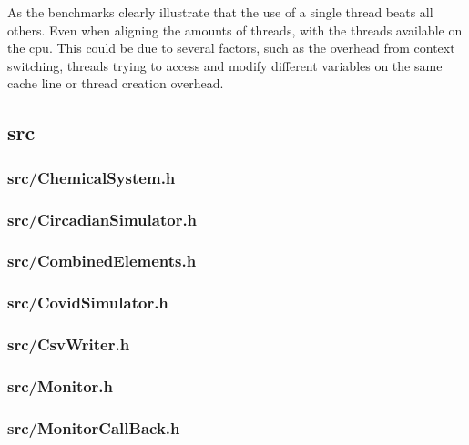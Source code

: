 As the benchmarks clearly illustrate that the use of a single thread beats all others. Even when aligning the amounts of threads, with the threads available on the cpu.  
This could be due to several factors, such as the overhead from context switching, threads trying to access and modify different variables on the same cache line or thread creation overhead.


\newpage
\subsection{src}
\subsubsection{src/ChemicalSystem.h}

\newpage
\subsubsection{src/CircadianSimulator.h}

\newpage
\subsubsection{src/CombinedElements.h}

\newpage
\subsubsection{src/CovidSimulator.h}

\newpage
\subsubsection{src/CsvWriter.h}

\newpage
\subsubsection{src/Monitor.h}

\newpage
\subsubsection{src/MonitorCallBack.h}

\newpage

